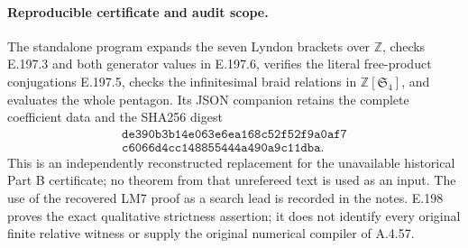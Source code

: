 \paragraph{Reproducible certificate and audit scope.}
The standalone program 
expands the seven Lyndon brackets over \(\mathbb Z\), checks
E.197.3 and both generator values in E.197.6, verifies the
literal free-product conjugations E.197.5, checks the
infinitesimal braid relations in \(\mathbb Z[\mathfrak S_4]\),
and evaluates the whole pentagon.  Its JSON companion retains
the complete coefficient data and the SHA256 digest
\[
\begin{gathered}
\texttt{de390b3b14e063e6ea168c52f52f9a0af7}\\[-2pt]
\texttt{c6066d4cc148855444a490a9c11dba}.
\end{gathered}
\]
This is an independently reconstructed replacement for the
unavailable historical Part B certificate; no theorem from
that unrefereed text is used as an input.  The use of the
recovered LM7 proof as a search lead is recorded in the notes.
E.198 proves the exact qualitative strictness assertion;
it does not identify every original finite relative witness
or supply the original numerical compiler of A.4.57.
